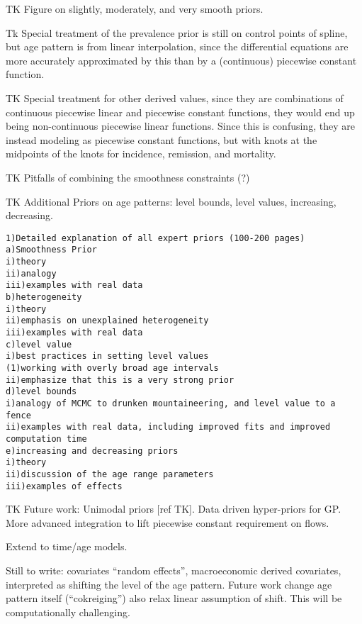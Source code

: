 TK Figure on slightly, moderately, and very smooth priors.

Tk Special treatment of the prevalence prior is still on control
points of spline, but age pattern is from linear interpolation, since
the differential equations are more accurately approximated by this
than by a (continuous) piecewise constant function.

TK Special treatment for other derived values, since they are
combinations of continuous piecewise linear and piecewise constant
functions, they would end up being non-continuous piecewise linear
functions.  Since this is confusing, they are instead modeling as
piecewise constant functions, but with knots at the midpoints of the
knots for incidence, remission, and mortality.

TK Pitfalls of combining the smoothness constraints (?)

TK Additional Priors on age patterns: level bounds, level values,
increasing, decreasing.
\begin{verbatim}
1)Detailed explanation of all expert priors (100-200 pages)
a)Smoothness Prior
i)theory
ii)analogy
iii)examples with real data
b)heterogeneity
i)theory
ii)emphasis on unexplained heterogeneity
iii)examples with real data
c)level value
i)best practices in setting level values
(1)working with overly broad age intervals
ii)emphasize that this is a very strong prior
d)level bounds
i)analogy of MCMC to drunken mountaineering, and level value to a
fence
ii)examples with real data, including improved fits and improved
computation time
e)increasing and decreasing priors
i)theory
ii)discussion of the age range parameters
iii)examples of effects
\end{verbatim}


TK Future work: Unimodal priors [ref TK].  Data driven hyper-priors
for GP.  More advanced integration to lift piecewise constant
requirement on flows.

Extend to time/age models.

Still to write: covariates ``random effects'', macroeconomic derived
covariates, interpreted as shifting the level of the age pattern.
Future work change age pattern itself (``cokreiging'') also relax
linear assumption of shift.  This will be computationally challenging.


